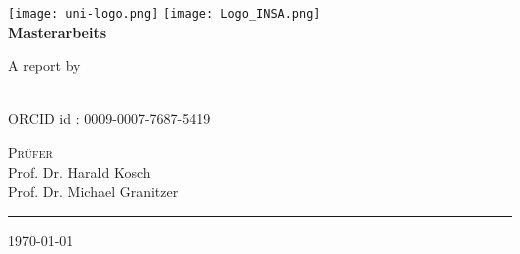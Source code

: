 \begin{titlepage}
    \centering
    \begin{onehalfspace}
    	
		\texttt{[image: uni-logo.png]}
		\hspace*{1.0cm}
		\texttt{[image: Logo\_INSA.png]}\\
		\vspace{1.0cm}
        	{\Large \bfseries Masterarbeits }\\

        	\vspace{2.5cm}

            \begin{doublespace}
            	{\textsf{\Huge{\thetitle}}}
            \end{doublespace}

        	\vspace{2cm}

            {\Large A report by}\\

        	\vspace{1cm}

        	{\bfseries \large{\theauthor} }\\ ORCID id : 0009-0007-7687-5419
			

        	\vfill

        	{\Large
                \textsc{Pr\"ufer} \\
				Prof. Dr. Harald Kosch \\
                Prof. Dr. Michael Granitzer\\
        	}

        	\vspace{1.5cm}

        	\parbox{\linewidth}{\hrule\strut}

            \vfill

			{\large \today}
    \end{onehalfspace}
\end{titlepage}
